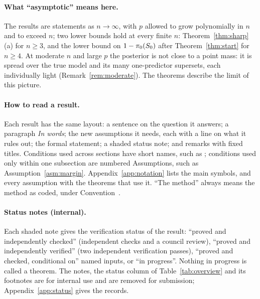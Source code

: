 \paragraph{What ``asymptotic'' means here.} The results are statements as $n\to\infty$, with $p$ allowed to grow
polynomially in $n$ and to exceed $n$; two lower bounds hold at every finite $n$: Theorem~\ref{thm:sharp}(a) for
$n\ge3$, and the lower bound on $1-\pi_0(S_0)$ after Theorem~\ref{thm:start} for $n\ge4$. At moderate $n$ and large $p$ the posterior is not close to a point mass: it
is spread over the true model and its many one-predictor supersets, each individually light (Remark~\ref{rem:moderate}).
The theorems describe the limit of this picture.

\paragraph{How to read a result.} Each result has the same layout: a sentence on the question it answers; a paragraph
\emph{In words}; the new assumptions it needs, each with a line on what it rules out; the formal statement;
\ifshowstatus a shaded status note; \fi and remarks with fixed titles. Conditions used across sections have short names, such
as ; conditions used only within one subsection are numbered Assumptions, such as Assumption~\ref{asm:margin}.
Appendix~\ref{app:notation} lists the main symbols, and every assumption with the theorems that use it. ``The method''
always means the method as coded, under Convention~.

\ifshowstatus
\paragraph{Status notes (internal).} Each shaded note gives the verification status of the result: ``proved and
independently checked'' (independent checks and a council review), ``proved and independently verified'' (two
independent verification passes), ``proved and checked, conditional on'' named inputs, or ``in progress''. Nothing in
progress is called a theorem. The notes, the status column of Table~\ref{tab:overview} and its footnotes are for internal
use and are removed for submission; Appendix~\ref{app:status} gives the records.
\fi

